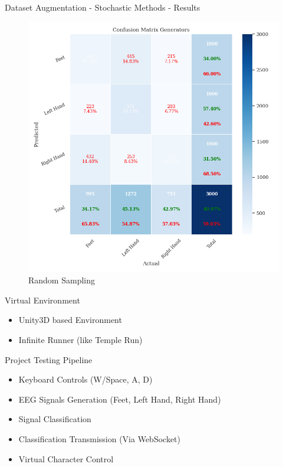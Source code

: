 \begin{frame}{Dataset Augmentation - Stochastic Methods - Results}
\begin{minipage}{0.49\textwidth}
\begin{figure}[htpb!]
            \centering
            \includegraphics[width=\textwidth]{figures/augmentation/stochastic/confusion_matrix_generators_2024_03_30_18_01_19_random_sampler_using_LSTMNet_0.5943600867678959.pkl.png}
            \caption{Random Sampling}
        \end{figure}
    \end{minipage}
\end{frame}

\begin{frame}{Virtual Environment}
\begin{itemize}
    \item Unity3D based Environment
    \item Infinite Runner (like Temple Run)
\end{itemize}
\end{frame}

\begin{frame}{Project Testing Pipeline}
    \begin{itemize}
        \item Keyboard Controls (W/Space, A, D)
        \item EEG Signals Generation (Feet, Left Hand, Right Hand)
        \item Signal Classification
        \item Classification Transmission (Via WebSocket)
        \item Virtual Character Control
    \end{itemize}
\end{frame}

